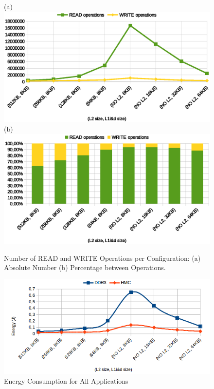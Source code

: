 \documentclass{sig-alternate-05-2015}
\begin{document}
\begin{figure}
	\centering
(a)\includegraphics[scale=0.40]{images/graficos/Oper_Number}(b)\includegraphics[scale=0.40]{images/graficos/Oper_Number_percentage}

\caption{\label{fig:N-READ_WRITE}Number of READ and WRITE Operations per Configuration:
(a) Absolute Number (b) Percentage between Operations.}
\end{figure}
\begin{figure}
	\centering
\includegraphics[scale=0.38]{images/graficos/EnergyConsumption_}\caption{\label{fig:Consumed_Energy}Energy Consumption for All Applications}
\end{figure}
\end{document}
